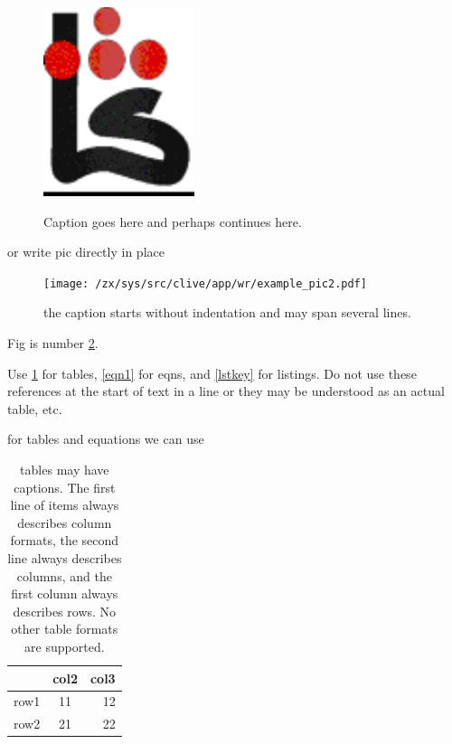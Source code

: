 \documentclass[a4paper]{article}
\begin{document}
    \begin{figure}
    \centering
        \includegraphics[width=\linewidth]{logols.pdf}
    \label{fig1}
    \caption{Caption goes here and perhaps continues here. }
    \end{figure}

or write pic directly in place

\begin{figure}
\centering
    \texttt{[image: /zx/sys/src/clive/app/wr/example\_pic2.pdf]}
\label{fig2}
\caption{the caption starts without indentation and may span several
lines. }
\end{figure}

Fig is number \ref{fig2}.

Use \ref{tbl1} for tables, \ref{eqn1} for eqns, and \ref{lstkey}
for listings. Do not use these references at the start of text in a
line or they may be understood as an actual table, etc.

for tables and equations we can use
\begin{table}
\centering
    \begin{tabular}{||l|c|r|}\hline
        	&col2	&col3\\ \hline
        row1	&11	&12\\ \hline
        row2	&21	&22\\
        \hline
    \end{tabular}
\label{tbl1}
    \caption{tables may have captions. The first line of items always
    describes column formats, the second line always describes columns,
    and the first column always describes rows. No other table formats are
    supported. }
\end{table}
\end{document}
